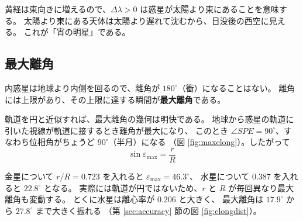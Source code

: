 \documentclass[a4paper,11pt]{ltjsarticle}
\begin{document}
黄経は東向きに増えるので、$\Delta\lambda>0$ は惑星が太陽より東にあることを意味する。
太陽より東にある天体は太陽より遅れて沈むから、日没後の西空に見える。
これが「宵の明星」である。

\subsection{最大離角}

内惑星は地球より内側を回るので、離角が $180^\circ$（衝）になることはない。
離角には上限があり、その上限に達する瞬間が\textbf{最大離角}である。

軌道を円と近似すれば、最大離角の幾何は明快である。
地球から惑星の軌道に引いた視線が軌道に接するとき離角が最大になり、
このとき $\angle SPE = 90^\circ$、すなわち位相角がちょうど $90^\circ$（半月）になる
（図 \ref{fig:maxelong}）。したがって
\begin{equation}
  \sin\varepsilon_{\max} = \frac{r}{R}
  \label{eq:maxelong}
\end{equation}

金星について $r/R = 0.723$ を入れると $\varepsilon_{\max} = 46.3^\circ$、
水星について $0.387$ を入れると $22.8^\circ$ となる。
実際には軌道が円ではないため、$r$ と $R$ が毎回異なり最大離角も変動する。
とくに水星は離心率が $0.206$ と大きく、
最大離角は $17.9^\circ$ から $27.8^\circ$ まで大きく振れる
（第 \ref{sec:accuracy} 節の図 \ref{fig:elongdist}）。
\end{document}
